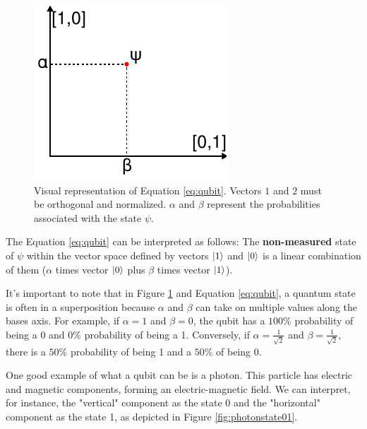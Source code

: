 		\begin{figure}[h]
			\centering
			\includegraphics{images/qubitPlot}
			\caption{Visual representation of Equation \ref{eq:qubit}. Vectors $1$ and $2$ must be orthogonal and normalized. $\alpha$ and $\beta$ represent the probabilities associated with the state $\psi$.}
			\label{fig:qubitplot}
		\end{figure}
		
		\par The Equation \ref{eq:qubit} can be interpreted as follows: The \textbf{non-measured} state of $\psi$ within the vector space defined by vectors $\ket{1}$ and $\ket{0}$ is a linear combination of them  ($\alpha$ times vector $\ket{0}$ plus $\beta$ times vector $\ket{1}$).\newline
		
		\par It's important to note that in Figure \ref{fig:qubitplot} and Equation \ref{eq:qubit}, a quantum state is often in a superposition because $\alpha$ and $\beta$ can take on multiple values along the bases axis. For example, if $\alpha = 1$ and $\beta = 0$, the qubit has a $100\%$ probability of being a 0 and $0\%$ probability of being a 1. Conversely, if $\alpha = \frac{1}{\sqrt{2}}$ and $\beta = \frac{1}{\sqrt{2}}$, there is a $50\%$ probability of being 1 and a $50\%$ of being 0.\newline
		
		\par One good example of what a qubit can be is a photon. This particle has electric and magnetic components, forming an electric-magnetic field. We can interpret, for instance, the "vertical" component as the state 0 and the "horizontal" component as the state 1, as depicted in Figure \ref{fig:photonstate01}.
		
